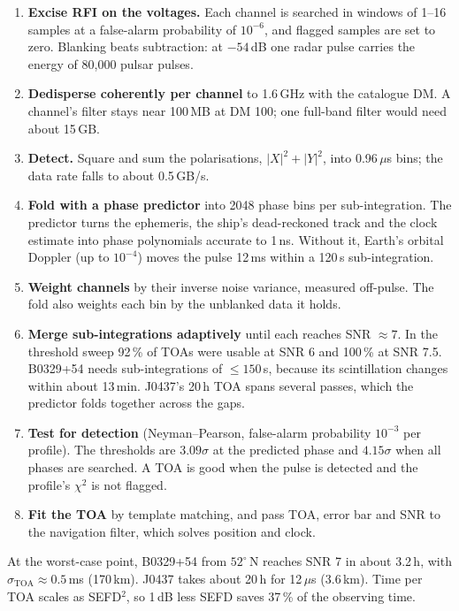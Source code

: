 \documentclass[11pt,a4paper]{article}
\begin{document}
\begin{enumerate}
\item \textbf{Excise RFI on the voltages.} Each channel is searched in windows of 1--16 samples at a
  false-alarm probability of $10^{-6}$, and flagged samples are set to zero. Blanking beats
  subtraction: at $-54$\,dB one radar pulse carries the energy of 80,000 pulsar pulses.
\item \textbf{Dedisperse coherently per channel} to 1.6\,GHz with the catalogue DM. A channel's filter
  stays near 100\,MB at DM 100; one full-band filter would need about 15\,GB.
\item \textbf{Detect.} Square and sum the polarisations, $|X|^2 + |Y|^2$, into 0.96\,$\mu$s bins; the
  data rate falls to about 0.5\,GB/s.
\item \textbf{Fold with a phase predictor} into 2048 phase bins per sub-integration. The predictor turns
  the ephemeris, the ship's dead-reckoned track and the clock estimate into phase polynomials accurate
  to 1\,ns. Without it, Earth's orbital Doppler (up to $10^{-4}$) moves the pulse 12\,ms within a
  120\,s sub-integration.
\item \textbf{Weight channels} by their inverse noise variance, measured off-pulse. The fold also
  weights each bin by the unblanked data it holds.
\item \textbf{Merge sub-integrations adaptively} until each reaches SNR $\approx 7$. In the threshold
  sweep 92\,\% of TOAs were usable at SNR 6 and 100\,\% at SNR 7.5. B0329+54 needs sub-integrations of
  $\le 150$\,s, because its scintillation changes within about 13\,min. J0437's 20\,h TOA spans several
  passes, which the predictor folds together across the gaps.
\item \textbf{Test for detection} (Neyman--Pearson, false-alarm probability $10^{-3}$ per profile). The
  thresholds are $3.09\sigma$ at the predicted phase and $4.15\sigma$ when all phases are searched. A
  TOA is good when the pulse is detected and the profile's $\chi^2$ is not flagged.
\item \textbf{Fit the TOA} by template matching, and pass TOA, error bar and SNR to the navigation
  filter, which solves position and clock.
\end{enumerate}

At the worst-case point, B0329+54 from $52^\circ$\,N reaches SNR 7 in about 3.2\,h, with
$\sigma_\mathrm{TOA} \approx 0.5$\,ms (170\,km). J0437 takes about 20\,h for 12\,$\mu$s (3.6\,km). Time
per TOA scales as SEFD$^2$, so 1\,dB less SEFD saves 37\,\% of the observing time.
\end{document}
